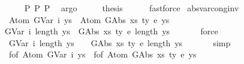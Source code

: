 \begin{isabellebody}
\ \ \ \ \isamarkupfalse%
\ P{}\ P{}\ P{}\ \isamarkupfalse%
\ argo\isanewline
\ \ \isamarkupfalse%
\ \isamarkupfalse%
\ {\isacharquery}{\kern0pt}thesis\isanewline
\ \ \ \ \isamarkupfalse%
\ fastforce\isanewline
{}\isamarkupfalse%
%
\endisatagproof
{\isafoldproof}%
%
\isadelimproof
\isanewline
%
\endisadelimproof
\isanewline
\isanewline
{}\isamarkupfalse%
\ abs{\isacharunderscore}{\kern0pt}var{\isacharunderscore}{\kern0pt}cong{\isacharunderscore}{\kern0pt}inv{\isacharcolon}{\kern0pt}\isanewline
\ \ {\isachardoublequoteopen}{\isasymnot}{\isacharparenleft}{\kern0pt}Atom\ {\isacharparenleft}{\kern0pt}GVar\ i{\isacharparenright}{\kern0pt}\ ys{\isacharprime}{\kern0pt}\ {\isasymsimeq}\ Atom\ {\isacharparenleft}{\kern0pt}GAbs\ xs\ ty{}\ e{\isacharparenright}{\kern0pt}\ ys{\isacharparenright}{\kern0pt}{\isachardoublequoteclose}\isanewline
%
\isadelimproof
%
\endisadelimproof
%
\isatagproof
{}\isamarkupfalse%
\ {\isacharminus}{\kern0pt}\isanewline
\ \ \isamarkupfalse%
\ {\isachardoublequoteopen}{\isasymnot}{\isacharparenleft}{\kern0pt}{\isacharparenleft}{\kern0pt}GVar\ i{\isacharcomma}{\kern0pt}\ length\ ys{\isacharprime}{\kern0pt}{\isacharparenright}{\kern0pt}\ {\isacharequal}{\kern0pt}\ {\isacharparenleft}{\kern0pt}GAbs\ xs\ ty{}\ e{\isacharcomma}{\kern0pt}\ length\ ys{\isacharparenright}{\kern0pt}{\isacharparenright}{\kern0pt}{\isachardoublequoteclose}\isanewline
\ \ \ \ \ \isamarkupfalse%
\ force\isanewline
\ \ \isamarkupfalse%
\ \isamarkupfalse%
\ {\isachardoublequoteopen}{\isasymnot}{\isacharparenleft}{\kern0pt}{\isacharbraceleft}{\kern0pt}{\isacharhash}{\kern0pt}\ {\isacharparenleft}{\kern0pt}GVar\ i{\isacharcomma}{\kern0pt}\ length\ ys{\isacharprime}{\kern0pt}{\isacharparenright}{\kern0pt}\ {\isacharhash}{\kern0pt}{\isacharbraceright}{\kern0pt}\ {\isacharequal}{\kern0pt}\ {\isacharbraceleft}{\kern0pt}{\isacharhash}{\kern0pt}\ {\isacharparenleft}{\kern0pt}GAbs\ xs\ ty{}\ e{\isacharcomma}{\kern0pt}\ length\ ys{\isacharparenright}{\kern0pt}\ {\isacharhash}{\kern0pt}{\isacharbraceright}{\kern0pt}{\isacharparenright}{\kern0pt}{\isachardoublequoteclose}\isanewline
\ \ \ \ \isamarkupfalse%
\ simp\isanewline
\ \ \isamarkupfalse%
\ \isamarkupfalse%
\ {\isachardoublequoteopen}{\isasymnot}\ f{\isacharunderscore}{\kern0pt}of\ {\isacharparenleft}{\kern0pt}Atom\ {\isacharparenleft}{\kern0pt}GVar\ i{\isacharparenright}{\kern0pt}\ ys{\isacharprime}{\kern0pt}{\isacharparenright}{\kern0pt}\ {\isacharequal}{\kern0pt}\ f{\isacharunderscore}{\kern0pt}of\ {\isacharparenleft}{\kern0pt}Atom\ {\isacharparenleft}{\kern0pt}GAbs\ xs\ ty{}\ e{\isacharparenright}{\kern0pt}\ ys{\isacharparenright}{\kern0pt}{\isachardoublequoteclose}\isanewline

\end{isabellebody}
